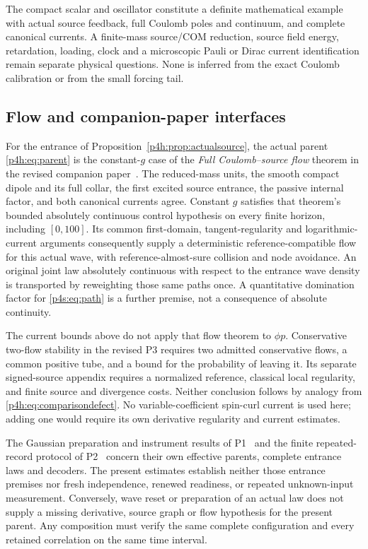 \documentclass[11pt]{article}
\numberwithin{equation}{section}
\theoremstyle{definition}
\theoremstyle{remark}
\begin{document}
The compact scalar and oscillator constitute a definite
mathematical example with actual source feedback, full
Coulomb poles and continuum, and complete canonical currents.
A finite-mass source/COM reduction, source field energy,
retardation, loading, clock and a microscopic Pauli or Dirac
current identification remain separate physical questions.
None is inferred from the exact Coulomb calibration or from
the small forcing tail.

\subsection{Flow and companion-paper interfaces}
\label{p4h:sec:flowinterface}

For the entrance of Proposition~\ref{p4h:prop:actualsource}, the actual
parent \eqref{p4h:eq:parent} is the constant-$g$ case of the
\emph{Full Coulomb--source flow} theorem in the revised companion
paper~\cite{RodgersP3}. The reduced-mass units, the smooth compact
dipole and its full collar, the first excited source entrance, the
passive internal factor, and both canonical currents agree. Constant
$g$ satisfies that theorem's bounded absolutely continuous control
hypothesis on every finite horizon, including $[0,100]$.
Its common first-domain, tangent-regularity and logarithmic-current
arguments consequently supply a deterministic reference-compatible
flow for this actual wave, with reference-almost-sure collision and
node avoidance. An original joint law absolutely continuous with
respect to the entrance wave density is transported by reweighting
those same paths once. A quantitative domination factor for
\eqref{p4s:eq:path} is a further premise, not a consequence of absolute
continuity.

The current bounds above do not apply that flow theorem to $\phi p$.
Conservative two-flow stability in the revised P3 requires two
admitted conservative flows, a common positive tube, and a bound for
the probability of leaving it. Its separate signed-source appendix
requires a normalized reference, classical local regularity, and
finite source and divergence costs. Neither conclusion follows by
analogy from \eqref{p4h:eq:comparisondefect}. No variable-coefficient
spin-curl current is used here; adding one would require its own
derivative regularity and current estimates.

The Gaussian preparation and instrument results of P1~\cite{RodgersP1}
and the finite repeated-record protocol of P2~\cite{RodgersP2} concern
their own effective parents, complete entrance laws and decoders.
The present estimates establish neither those entrance premises nor
fresh independence, renewed readiness, or repeated unknown-input
measurement. Conversely, wave reset or preparation of an actual law
does not supply a missing derivative, source graph or flow hypothesis
for the present parent. Any composition must verify the same complete
configuration and every retained correlation on the same time interval.
\end{document}
